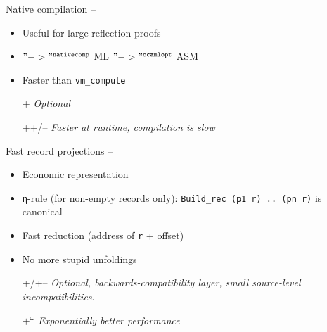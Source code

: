 
\begin{subsecframe}{Native compilation -- }
\begin{itemize}
\item Useful for large reflection proofs
\item \Coq $"->"^{\texttt{nativecomp}}$ \textsc{ML} $"->"^{\texttt{ocamlopt}}$ \textsc{ASM}
\item Faster than \texttt{vm\_compute}
\end{itemize}

  \begin{itemize}
  \item[+] \emph{Optional}
  \item[++/--] \emph{Faster at runtime, compilation is slow}
  \end{itemize}
\end{subsecframe}


\begin{subsecframefragile}{Fast record projections -- }
  \begin{itemize}
  \item Economic representation
  \item η-rule (for non-empty records only): 
    \verb|Build_rec (p1 r) .. (pn r)| is canonical
  \item Fast reduction (address of \verb|r| + offset)
  \item No more stupid unfoldings
  \end{itemize}
  
  \begin{itemize}
  \item[+/+--] \emph{Optional, backwards-compatibility layer,
      small source-level incompatibilities}.
  \item[${+}^{ω}$] \emph{Exponentially better performance}
  \end{itemize}


\end{subsecframefragile}



